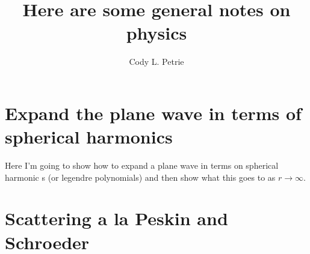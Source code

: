 \documentclass[12pt]{extarticle}
\title{Here are some general notes on physics}
\author{Cody L. Petrie}
\begin{document}
\maketitle

\tableofcontents

\section{Expand the plane wave in terms of spherical harmonics}
Here I'm going to show how to expand a plane wave in terms on spherical harmonic
s (or legendre polynomials) and then show what this goes to as $r \rightarrow \infty$.


\section{Scattering a la Peskin and Schroeder}
\end{document}
